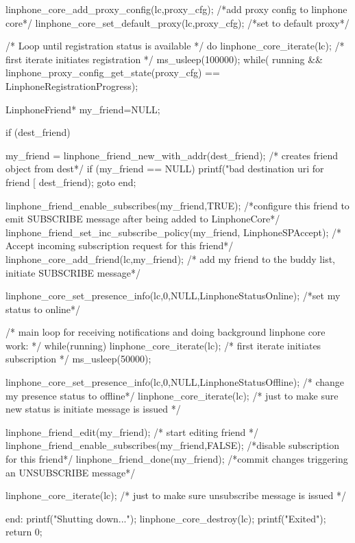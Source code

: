 \begin{DoxyCodeInclude}
{{                linphone_core_add_proxy_config(lc,proxy_cfg); /*add proxy
       config to linphone core*/
                linphone_core_set_default_proxy(lc,proxy_cfg); /*set to default
       proxy*/


                /* Loop until registration status is available */
                do {
                        linphone_core_iterate(lc); /* first iterate initiates
       registration */
                        ms_usleep(100000);
                }
                while(  running && linphone_proxy_config_get_state(proxy_cfg) 
      == LinphoneRegistrationProgress);

        }
        LinphoneFriend* my_friend=NULL;

        if (dest_friend) {
                my_friend = linphone_friend_new_with_addr(dest_friend); /*
      creates friend object from dest*/
                if (my_friend == NULL) {
                        printf("bad destination uri for friend [%
      dest_friend);
                        goto end;
                }

                linphone_friend_enable_subscribes(my_friend,TRUE); /*configure
       this friend to emit SUBSCRIBE message after being added to LinphoneCore*/
                linphone_friend_set_inc_subscribe_policy(my_friend,
      LinphoneSPAccept); /* Accept incoming subscription request for this friend*/
                linphone_core_add_friend(lc,my_friend); /* add my friend to the
       buddy list, initiate SUBSCRIBE message*/

        }

        linphone_core_set_presence_info(lc,0,NULL,LinphoneStatusOnline); /*set
       my status to online*/

        /* main loop for receiving notifications and doing background linphone
       core work: */
        while(running){
                linphone_core_iterate(lc); /* first iterate initiates
       subscription */
                ms_usleep(50000);
        }

        linphone_core_set_presence_info(lc,0,NULL,LinphoneStatusOffline); /*
       change my presence status to offline*/
        linphone_core_iterate(lc); /* just to make sure new status is initiate
       message is issued */

        linphone_friend_edit(my_friend); /* start editing friend */
        linphone_friend_enable_subscribes(my_friend,FALSE); /*disable
       subscription for this friend*/
        linphone_friend_done(my_friend); /*commit changes triggering an
       UNSUBSCRIBE message*/

        linphone_core_iterate(lc); /* just to make sure unsubscribe message is
       issued */

end:
        printf("Shutting down...\n");
        linphone_core_destroy(lc);
        printf("Exited\n");
        return 0;
}

\end{DoxyCodeInclude}
 